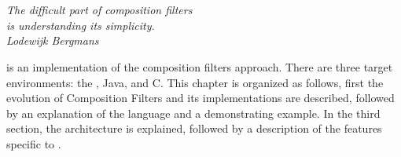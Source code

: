 \chapter{\Compose*{}}
\begin{flushright}
\textit{The difficult part of composition filters}\\
\textit{is understanding its simplicity.}\\
\textit{Lodewijk Bergmans}\\
\end{flushright}

\label{chp:ComposeStar}

\Compose* is an implementation of the composition filters approach. There are three target environments: the \dotNET, Java, and C.
This chapter is organized as follows, first the evolution of Composition Filters and its implementations are described, followed by an explanation of the \Compose* language and a demonstrating example. 
In the third section, the \Compose* architecture is explained, followed by a description of the features specific to \Compose*.












